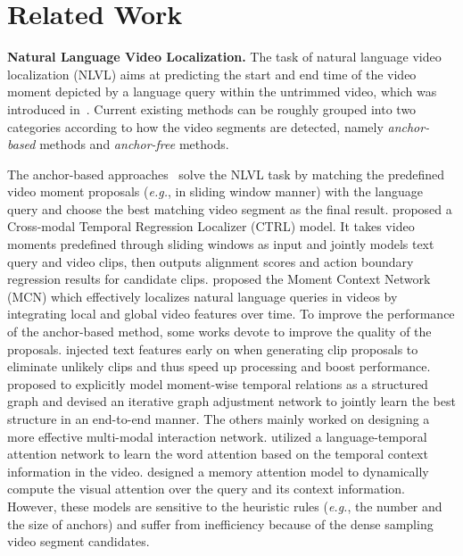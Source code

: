 \documentclass[letterpaper]{article} %
\newcommand{\eg}{\emph{e.g.}}
\begin{document}
\section{Related Work}
\textbf{Natural Language Video Localization.}
The task of natural language video localization (NLVL) aims at predicting the start and end time of the video moment depicted by a language query within the untrimmed video, which was introduced in~\cite{DBLP:conf/iccv/HendricksWSSDR17,DBLP:conf/iccv/GaoSYN17}.
Current existing methods can be roughly grouped into two categories according to how the video segments are detected, namely \emph{anchor-based} methods and \emph{anchor-free} methods.

The anchor-based approaches~\cite{DBLP:conf/iccv/GaoSYN17,DBLP:conf/iccv/HendricksWSSDR17,DBLP:conf/emnlp/HendricksWSSDR18,DBLP:conf/mm/LiuWN0CC18,DBLP:conf/sigir/LiuWN0CC18,DBLP:conf/aaai/Xu0PSSS19,DBLP:conf/cvpr/ZhangDWWD19} solve the NLVL task by matching the predefined video moment proposals (\eg, in sliding window manner) with the language query and choose the best matching video segment as the final result.
\citet{DBLP:conf/iccv/GaoSYN17} proposed a Cross-modal
Temporal Regression Localizer (CTRL) model. It takes video moments predefined through sliding windows as input and jointly models text
query and video clips, then outputs alignment scores and action
boundary regression results for candidate clips.
\citet{DBLP:conf/iccv/HendricksWSSDR17} proposed the Moment Context Network (MCN) which effectively localizes natural language queries in videos by integrating local and global video features over time.
To improve the performance of the anchor-based method, some works devote to improve the quality of the proposals.
\citet{DBLP:conf/aaai/Xu0PSSS19} injected text features early on when generating clip proposals to eliminate unlikely clips and thus speed up processing and boost performance.
\citet{DBLP:conf/cvpr/ZhangDWWD19} proposed to explicitly model moment-wise temporal relations as a structured graph and devised
an iterative graph adjustment network to jointly learn the
best structure in an end-to-end manner.
The others mainly worked on designing a more effective multi-modal interaction network.
\citet{DBLP:conf/mm/LiuWN0CC18} utilized a language-temporal
attention network to learn the word attention based on
the temporal context information in the video.
\citet{DBLP:conf/sigir/LiuWN0CC18} designed a memory attention model to dynamically compute the visual attention over the query and its context
information. However, these models are sensitive to the heuristic rules (\eg, the number and the size of anchors) and suffer from inefficiency because of the dense sampling video segment candidates.
\end{document}
